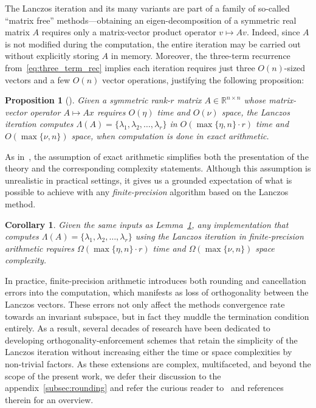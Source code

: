 \documentclass[10pt]{article}
\numberwithin{equation}{section}
\newcommand{\+}{%
	\raisebox{0.18ex}{\scaleobj{0.55}{+}}
}
\newtheorem{proposition}{Proposition}
\newtheorem{corollary}{Corollary}
\theoremstyle{definition}
\theoremstyle{definition}
\begin{document}
 The Lanczos iteration and its many variants are part of a family of so-called ``matrix free'' methods---obtaining an eigen-decomposition of a symmetric real matrix $A$ requires only a matrix-vector product operator $v \mapsto Av$. 
Indeed, since $A$ is not modified during the computation, the entire iteration may be carried out without explicitly storing $A$ in memory. 
Moreover, the three-term recurrence from~\eqref{eq:three_term_rec} implies each iteration requires just three $O(n)$-sized vectors and a few $O(n)$ vector operations, justifying the following proposition:
\begin{proposition}[\cite{parlett1994we, simon1984analysis}]\label{lemma:exact_arith_lanczos}
	Given a symmetric rank-$r$ matrix $A \in \mathbb{R}^{n \times n}$ whose matrix-vector operator $A \mapsto A x$ requires $O(\eta)$ time and $O(\nu)$ space, the Lanczos iteration computes $\Lambda(A) = \{ \lambda_1, \lambda_2, \dots, \lambda_r \}$ in $O(\max\{\eta, n\}\cdot r)$ time and $O(\max\{\nu, n\})$ space, when computation is done in exact arithmetic. 
\end{proposition}
\noindent As in~\cite{parlett1994we}, the assumption of exact arithmetic simplifies both the presentation of the theory and the corresponding complexity statements. 
Although this assumption is unrealistic in practical settings, it gives us a grounded expectation of what is possible to achieve with any \emph{finite-precision} algorithm based on the Lanczos method.
\begin{corollary}\label{cor:finite_arith_lanczos}
	Given the same inputs as Lemma~\ref{lemma:exact_arith_lanczos}, any implementation that computes $\Lambda(A) = \{ \lambda_1, \lambda_2, \dots, \lambda_r \}$ using the Lanczos iteration in finite-precision arithmetic requires $\Omega(\max\{\eta, n\} \cdot r)$ time and $\Omega(\max\{\nu, n\})$ space complexity. 
\end{corollary}
\noindent
In practice, finite-precision arithmetic introduces both rounding and cancellation errors into the computation, which manifests as loss of orthogonality between the Lanczos vectors. These errors not only affect the methods convergence rate towards an invariant subspace, but in fact they muddle the termination condition entirely. 
As a result, several decades of research have been dedicated to developing orthogonality-enforcement schemes that retain the simplicity of the Lanczos iteration without increasing either the time or space complexities by non-trivial factors. 
As these extensions are complex, multifaceted, and beyond the scope of the present work, we defer their discussion to the appendix~\ref{subsec:rounding} and refer the curious reader to~\cite{golub2013matrix, parlett1994we, simon1984analysis} and references therein for an overview. 
\end{document}
